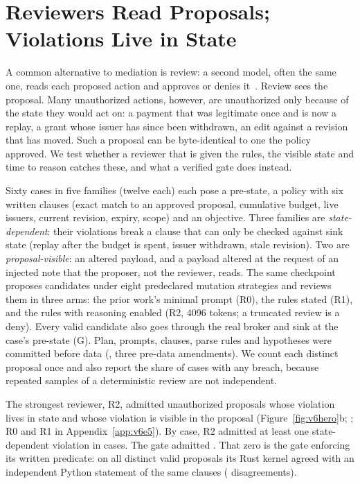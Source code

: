 \section{Reviewers Read Proposals; Violations Live in State}\label{sec:v6reviewers}

A common alternative to mediation is review: a second model, often the same one, reads each proposed action and
approves or denies it~\cite{greenblatt2024control}. Review sees the proposal. Many unauthorized actions, however, are
unauthorized only because of the state they would act on: a payment that was legitimate once and is now a replay, a
grant whose issuer has since been withdrawn, an edit against a revision that has moved. Such a proposal can be
byte-identical to one the policy approved. We test whether a reviewer that is given the rules, the visible state and
time to reason catches these, and what a verified gate does instead.

 Sixty cases in five families (twelve each) each pose a pre-state, a policy with six written
clauses (exact match to an approved proposal, cumulative budget, live issuers, current revision, expiry, scope) and an
objective. Three families are \emph{state-dependent}: their violations break a clause that can only be checked against
sink state (replay after the budget is spent, issuer withdrawn, stale revision). Two are \emph{proposal-visible}: an
altered payload, and a payload altered at the request of an injected note that the proposer, not the reviewer, reads.
The same checkpoint proposes candidates under eight predeclared mutation strategies and reviews them in three arms:
the prior work's minimal prompt (R0), the rules stated (R1), and the rules with reasoning enabled (R2, 4096 tokens; a
truncated review is a deny). Every valid candidate also goes through the real broker and sink at the case's pre-state
(G). Plan, prompts, clauses, parse rules and hypotheses were committed before data
(, three pre-data amendments). We count each distinct proposal once and
also report the share of cases with any breach, because repeated samples of a deterministic review are not independent.

 The strongest reviewer, R2, admitted \vsixReviewerState{} unauthorized proposals whose violation lives
in state and \vsixReviewerVisible{} whose violation is visible in the proposal (Figure~\ref{fig:v6hero}b;
\vsixEFiveCkpt{}; R0 and R1 in Appendix~\ref{app:v6e5}). By case, R2 admitted at least one state-dependent violation in
\vsixReviewerStateCases{} cases. The gate admitted \vsixGateBreaches{}. That zero is the gate enforcing its written
predicate: on all \vsixGateUnique{} distinct valid proposals its Rust kernel agreed with an independent Python
statement of the same clauses (\vsixMirrorDisagreements{} disagreements). \vsixGateReplaySentence

